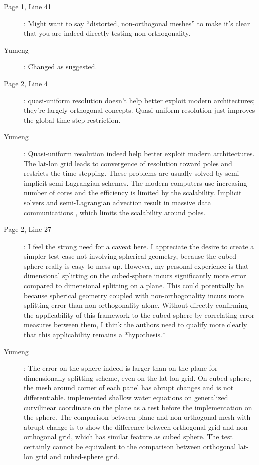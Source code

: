 \documentclass[12pt,a4paper]{article}
\begin{document}
\begin{description}
\item [Page 1, Line 41]: Might want to say ``distorted, non-orthogonal meshes'' to make it's clear that you are indeed directly testing non-orthogonality.

\item [Yumeng]: Changed as suggested.

\item [Page 2, Line 4]: quasi-uniform resolution doesn't help better exploit modern architectures; they're largely orthogonal concepts. Quasi-uniform resolution just improves the global time step restriction.

\item [Yumeng]: Quasi-uniform resolution indeed help better exploit modern architectures. The lat-lon grid leads to convergence of resolution toward poles and restricts the time stepping. These problems are usually solved by semi-implicit semi-Lagrangian schemes. The modern computers use increasing number of cores and the efficiency is limited by the scalability. Implicit solvers and semi-Lagrangian advection result in massive data communications \citep{ST12}, which limits the scalability around poles.

\item [Page 2, Line 27]: I feel the strong need for a caveat here. I appreciate the desire to create a simpler test case not involving spherical geometry, because the cubed-sphere really is easy to mess up. However, my personal experience is that dimensional splitting  on the cubed-sphere incurs significantly more error compared to dimensional splitting on a plane. This could potentially be because spherical geometry coupled with non-orthogonality incurs more splitting error than non-orthogonality alone. Without directly confirming the applicability of this framework to the cubed-sphere by correlating error measures between them, I think the authors need to qualify more clearly that this applicability remains a *hypothesis.*

\item [Yumeng]: The error on the sphere indeed is larger than on the plane for dimensionally splitting scheme, even on the lat-lon grid. On cubed sphere, the mesh around corner of each panel has abrupt changes and is not differentiable. \cite{TN17} implemented shallow water equations on generalized curvilinear coordinate on the plane as a test before the implementation on the sphere. The comparison between plane and non-orthogonal mesh with abrupt change is to show the difference between orthogonal grid and non-orthogonal grid, which has similar feature as cubed sphere. The test certainly cannot be equivalent to the comparison between orthogonal lat-lon grid and cubed-sphere grid.


\end{description}
\end{document}
